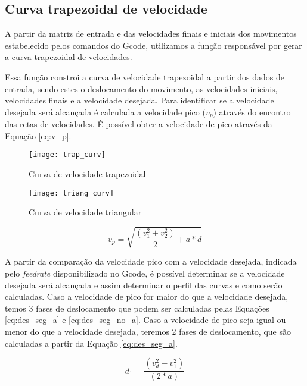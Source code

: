 \subsection{Curva trapezoidal de velocidade}

A partir da matriz de entrada e das velocidades finais e iniciais dos movimentos estabelecido pelos comandos do Gcode,
utilizamos a função responsável por gerar a curva trapezoidal de velocidades.

Essa função constroi a curva de velocidade trapezoidal a partir dos dados
de entrada, sendo estes o deslocamento do movimento, as velocidades iniciais, velocidades finais e a velocidade desejada.
Para identificar se a velocidade desejada será alcançada é calculada a velocidade pico ($v_p$) através do encontro das retas de velocidades. É possível obter a velocidade de pico através da Equação \ref{eq:v_p}.

\begin{figure}[H]
    \centering
    \caption{Curva de velocidade trapezoidal}
    \texttt{[image: trap\_curv]}

    \label{fig:trap_curv}
\end{figure}

\begin{figure}[H]
    \centering
    \caption{Curva de velocidade triangular}
    \texttt{[image: triang\_curv]}

    \label{fig:triang_curv}
\end{figure}

\begin{equation}
    \label{eq:v_p}
    v_p = \sqrt{\frac{(v_1^2+v_2^2)}{2}+a*d}
\end{equation}

A partir da comparação da velocidade pico com a velocidade desejada, indicada pelo \textit{feedrate} disponibilizado no Gcode,
é possível determinar se a velocidade desejada será alcançada e assim determinar o perfil das curvas e como serão calculadas.
Caso a velocidade de pico for maior do que a velocidade desejada, temos 3 fases de deslocamento
que podem ser calculadas pelas Equações \ref{eq:des_seg_a} e \ref{eq:des_seg_no_a}. Caso a velocidade de pico seja igual ou menor do que a velocidade desejada, teremos 2 fases de deslocamento,
que são calculadas a partir da Equação \ref{eq:des_seg_a}.

\begin{equation}
    \label{eq:des_seg_a}
    d_1 = \frac{(v_d^2-v_1^2)}{(2*a)}
\end{equation}


